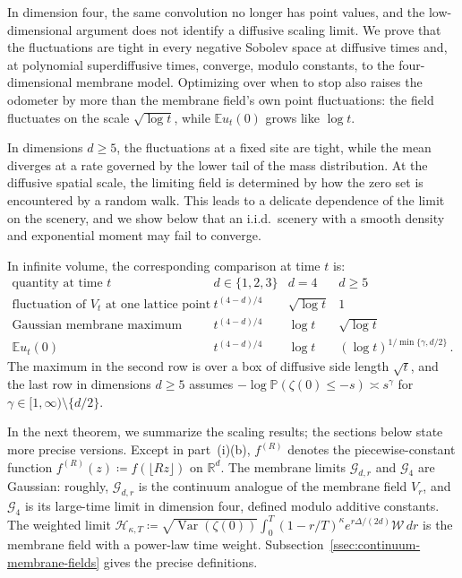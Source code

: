 \documentclass[11pt]{amsart}
\theoremstyle{plain}
\theoremstyle{definition}
\newcommand{\R}{\mathbb{R}}
\newcommand{\E}{\mathbb{E}}
\renewcommand{\P}{\mathbb{P}}
\DeclareMathOperator{\Var}{Var}
\begin{document}
In dimension four, the same convolution no longer has point values, and the low-dimensional argument does not identify a diffusive scaling limit. We prove that the fluctuations are tight in every negative Sobolev space at diffusive times and, at polynomial superdiffusive times, converge, modulo constants, to the four-dimensional membrane model. Optimizing over when to stop also raises the odometer by more than the membrane field's own point fluctuations: the field fluctuates on the scale $\sqrt{\log t}$, while $\E u_t(0)$ grows like $\log t$.

In dimensions $d\geq5$, the fluctuations at a fixed site are tight, while the mean diverges at a rate governed by the lower tail of the mass distribution. At the diffusive spatial scale, the limiting field is determined by how the zero set is encountered by a random walk. This leads to a delicate dependence of the limit on the scenery, and we show below that an i.i.d.\ scenery with a smooth density and exponential moment may fail to converge.

In infinite volume, the corresponding comparison at time $t$ is:
\[
\begin{array}{c|ccc}
\text{quantity at time }t & d\in\{1,2,3\} & d=4 & d\geq5\\
\hline
\text{fluctuation of }V_t\text{ at one lattice point}
& t^{(4-d)/4} & \sqrt{\log t} & 1\\
\text{Gaussian membrane maximum}
& t^{(4-d)/4} & \log t & \sqrt{\log t}\\
\E u_t(0)
& t^{(4-d)/4} & \log t &
(\log t)^{1/\min\{\gamma,d/2\}} \, .
\end{array}
\]
The maximum in the second row is over a box of diffusive side length $\sqrt t$, and the last row in dimensions $d\geq5$ assumes $-\log\P(\zeta(0)\leq-s)\asymp s^\gamma$ for $\gamma\in[1,\infty)\setminus\{d/2\}$.

In the next theorem, we summarize the scaling results; the sections below state more precise versions. Except in part~\textup{(i)(b)}, $f^{(R)}$ denotes the piecewise-constant function $f^{(R)}(z)\coloneqq f(\lfloor Rz\rfloor)$ on $\R^d$.
The membrane limits $\mathcal G_{d,r}$ and $\mathcal G_4$ are Gaussian: roughly, $\mathcal G_{d,r}$ is the continuum analogue of the membrane field $V_r$, and $\mathcal G_4$ is its large-time limit in dimension four, defined modulo additive constants. The weighted limit $\mathcal H_{\kappa,T}\coloneqq\sqrt{\Var(\zeta(0))}\int_0^T(1-r/T)^\kappa e^{r\Delta/(2d)}\mathcal W\,dr$ is the membrane field with a power-law time weight. Subsection~\ref{ssec:continuum-membrane-fields} gives the precise definitions.
\end{document}
